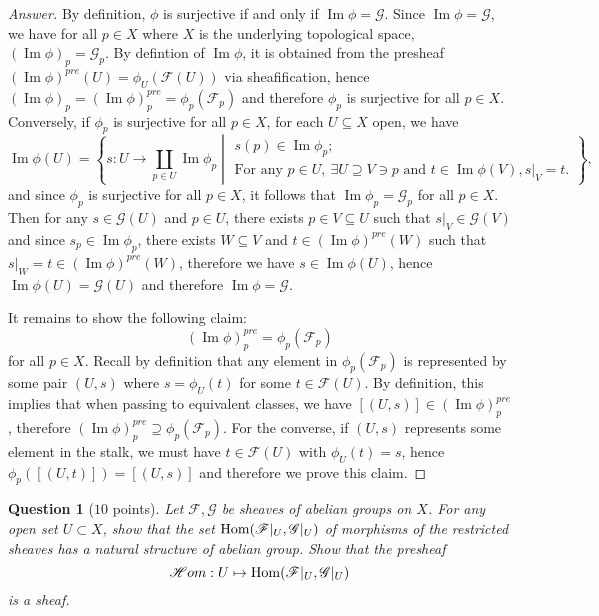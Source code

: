 \documentclass[12pt]{amsart}
\newcommand{\Ima}{\operatorname{Im}}
\newtheorem{question}{Question}
\begin{document}
\begin{proof}
    [Answer] By definition, $\phi $ is surjective if and only if $\Ima\phi =\mathscr{G} $. Since $\Ima\phi =\mathscr{G} $, we have for all $p\in X$ where $X$ is the underlying topological space, $(\Ima\phi )_p =\mathscr{G}_p $. By defintion of $\Ima\phi $, it is obtained from the presheaf $(\Ima\phi )^{pre} (U)=\phi_U (\mathscr{F} (U))$ via sheafification, hence $(\Ima\phi )_p =(\Ima\phi )^{pre}_p =\phi_p (\mathscr{F}_p )$ and therefore $\phi_p $ is surjective for all $p\in X$. Conversely, if $\phi_p $ is surjective for all $p\in X$, for each $U\subseteq X$ open, we have \[\Ima\phi (U)=\left\{s\colon U\to\displaystyle{\coprod_{p\in U}\Ima\phi_p }\middle\vert\begin{array}{l} s(p)\in\Ima\phi_p ;\\\text{For any }p\in U,\ \exists U\supseteq V\ni p\text{ and } t\in\Ima\phi (V), s\vert_V =t.\end{array}\right\},\]and since $\phi_p $ is surjective for all $p\in X$, it follows that $\Ima\phi_p =\mathscr{G}_p $ for all $p\in X$. Then for any $s\in\mathscr{G} (U)$ and $p\in U$, there exists $p\in V\subseteq U$ such that $s\vert_V\in\mathscr{G} (V)$ and since $s_p\in\Ima\phi_p $, there exists $W\subseteq V$ and $t\in (\Ima\phi )^{pre} (W)$ such that $s\vert_W =t\in (\Ima\phi )^{pre} (W)$, therefore we have $s\in\Ima\phi (U)$, hence $\Ima\phi (U)=\mathscr{G} (U)$ and therefore $\Ima\phi =\mathscr{G} $.
    
    It remains to show the following claim:
    \[
    (\Ima\phi )^{pre}_p =\phi_p (\mathscr{F}_p )
    \]
    for all $p\in X$. Recall by definition that any element in $\phi_p (\mathscr{F}_p )$ is represented by some pair $(U,s)$ where $s=\phi_U (t)$ for some $t\in\mathscr{F} (U)$. By definition, this implies that when passing to equivalent classes, we have $[(U,s)]\in (\Ima\phi )_p^{pre} $, therefore $(\Ima\phi )^{pre}_p\supseteq\phi_p (\mathscr{F}_p )$. For the converse, if $(U,s)$ represents some element in the stalk, we must have $t\in\mathscr{F} (U)$ with $\phi_U (t)=s$, hence $\phi_p ([(U,t)])=[(U,s)]$ and therefore we prove this claim.
\end{proof}

\begin{question}[$10$ points]
Let $ \mathscr F, \mathscr G$ be sheaves of abelian groups on $X$. For any open set $U \subset X$, show that the set ${\rm Hom}(\mathscr{F}|_U, \mathscr{G}|_U)$ of morphisms of the restricted sheaves has a natural structure of abelian group. Show that the presheaf
\[
{\mathscr H}om: U \mapsto {\rm Hom}(\mathscr{F}|_U, \mathscr{G}|_U)
\] is a sheaf.

\end{question}
\end{document}
